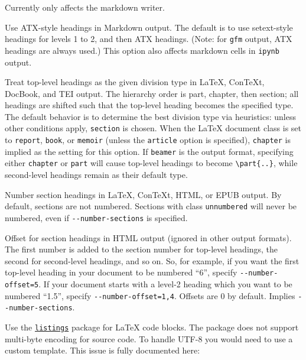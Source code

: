 \documentclass[
]{article}
\begin{document}
\begin{description}
Currently only affects the markdown writer.
\item[\texttt{-\/-atx-headers}]
Use ATX-style headings in Markdown output. The default is to use
setext-style headings for levels 1 to 2, and then ATX headings. (Note:
for \texttt{gfm} output, ATX headings are always used.) This option also
affects markdown cells in \texttt{ipynb} output.
\item[\texttt{-\/-top-level-division={[}default\textbar{}section\textbar{}chapter\textbar{}part{]}}]
Treat top-level headings as the given division type in LaTeX, ConTeXt,
DocBook, and TEI output. The hierarchy order is part, chapter, then
section; all headings are shifted such that the top-level heading
becomes the specified type. The default behavior is to determine the
best division type via heuristics: unless other conditions apply,
\texttt{section} is chosen. When the LaTeX document class is set to
\texttt{report}, \texttt{book}, or \texttt{memoir} (unless the
\texttt{article} option is specified), \texttt{chapter} is implied as
the setting for this option. If \texttt{beamer} is the output format,
specifying either \texttt{chapter} or \texttt{part} will cause top-level
headings to become \texttt{\textbackslash{}part\{..\}}, while
second-level headings remain as their default type.
\item[\texttt{-N}, \texttt{-\/-number-sections}]
Number section headings in LaTeX, ConTeXt, HTML, or EPUB output. By
default, sections are not numbered. Sections with class
\texttt{unnumbered} will never be numbered, even if
\texttt{-\/-number-sections} is specified.
\item[\texttt{-\/-number-offset=}\emph{NUMBER}{[}\texttt{,}\emph{NUMBER}\texttt{,}\emph{\ldots{}}{]}]
Offset for section headings in HTML output (ignored in other output
formats). The first number is added to the section number for top-level
headings, the second for second-level headings, and so on. So, for
example, if you want the first top-level heading in your document to be
numbered ``6'', specify \texttt{-\/-number-offset=5}. If your document
starts with a level-2 heading which you want to be numbered ``1.5'',
specify \texttt{-\/-number-offset=1,4}. Offsets are 0 by default.
Implies \texttt{-\/-number-sections}.
\item[\texttt{-\/-listings}]
Use the \href{https://ctan.org/pkg/listings}{\texttt{listings}} package
for LaTeX code blocks. The package does not support multi-byte encoding
for source code. To handle UTF-8 you would need to use a custom
template. This issue is fully documented here:

\end{description}
\end{document}
